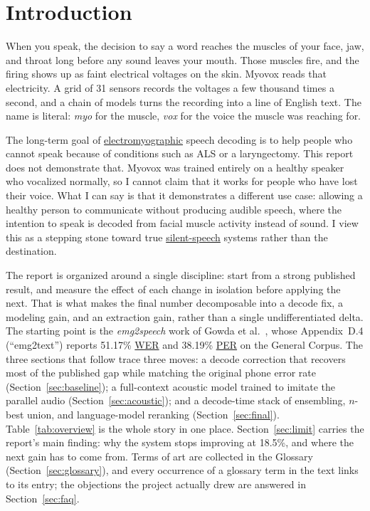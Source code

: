 \documentclass{article}
\DeclareRobustCommand{\glref}[2]{\hyperlink{gl:#1}{\textcolor{glosslink}{#2}}}
\DeclareRobustCommand{\wer}{\glref{wer}{WER}}
\DeclareRobustCommand{\per}{\glref{per}{PER}}
\begin{document}
\section{Introduction}

When you speak, the decision to say a word reaches the muscles of your face, jaw, and throat long
before any sound leaves your mouth. Those muscles fire, and the firing shows up as faint electrical
voltages on the skin. Myovox reads that electricity. A grid of 31 sensors records the voltages a few
thousand times a second, and a chain of models turns the recording into a line of English text. The
name is literal: \emph{myo} for the muscle, \emph{vox} for the voice the muscle was reaching for.

The long-term goal of \glref{emg}{electromyographic} speech decoding is to help people who cannot
speak because of conditions such as ALS or a laryngectomy. This report does not demonstrate that.
Myovox was trained entirely on a healthy speaker who vocalized normally, so I cannot claim that it
works for people who have lost their voice. What I can say is that it demonstrates a different use
case: allowing a healthy person to communicate without producing audible speech, where the intention
to speak is decoded from facial muscle activity instead of sound. I view this as a stepping stone
toward true \glref{silent}{silent-speech} systems rather than the destination.

The report is organized around a single discipline: start from a strong published result, and measure
the effect of each change in isolation before applying the next. That is what makes the final number
decomposable into a decode fix, a modeling gain, and an extraction gain, rather than a single
undifferentiated delta. The starting point is the \emph{emg2speech} work of Gowda et
al.~\citep{gowda2026emg2speech}, whose Appendix~D.4 (``emg2text'') reports 51.17\% \wer{} and 38.19\%
\per{} on the General Corpus. The three sections that follow trace three moves: a decode correction
that recovers most of the published gap while matching the original phone error rate
(Section~\ref{sec:baseline}); a full-context acoustic model trained to imitate the parallel audio
(Section~\ref{sec:acoustic}); and a decode-time stack of ensembling, $n$-best union, and
language-model reranking (Section~\ref{sec:final}). Table~\ref{tab:overview} is the whole story in
one place. Section~\ref{sec:limit} carries the report's main finding: why the system stops improving
at 18.5\%, and where the next gain has to come from. Terms
of art are collected in the Glossary (Section~\ref{sec:glossary}), and every occurrence of a glossary
term in the text links to its entry; the objections the project actually drew are answered in
Section~\ref{sec:faq}.
\end{document}
